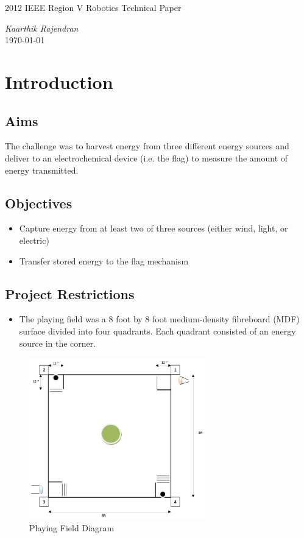\documentclass[12pt]{article}
\begin{document}


\begin{center}
{\Huge 2012 IEEE Region V Robotics Technical Paper}\\[\baselineskip]
\end{center}
{\large\itshape Kaarthik Rajendran }\\[\baselineskip]
\today 

\section{Introduction}
\subsection{Aims}
The challenge was to harvest energy from three different energy sources and deliver to an electrochemical device (i.e. the flag) to measure the amount of energy transmitted. 

\subsection{Objectives}
\begin{itemize}
	\item Capture energy from at least two of three sources (either wind, light, or electric)
	\item Transfer stored energy to the flag mechanism
\end{itemize}
\subsection{Project Restrictions}
\begin{itemize}
	\item The playing field was a 8 foot by 8 foot medium-density fibreboard (MDF) surface divided into four quadrants. Each quadrant consisted of an energy source in the corner. 
\end{itemize}

\begin{figure}[htbp] %
   \centering
   \includegraphics[width=3in]{Robotics2012PlayingField} 
   \caption{Playing Field Diagram}
   \label{fig:playing field}
\end{figure}
\end{document}
